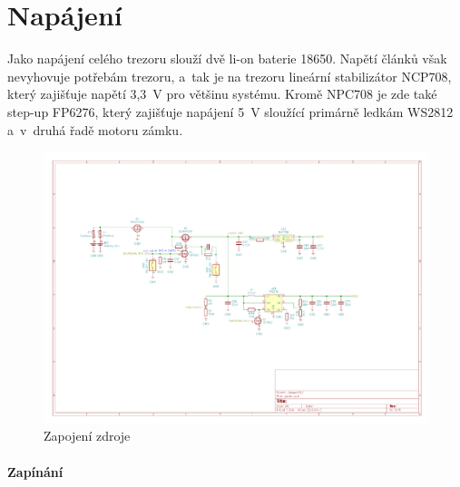 \section{Napájení}

Jako napájení celého trezoru slouží dvě li-on baterie 18650. Napětí článků však nevyhovuje potřebám trezoru, a~tak je na trezoru lineární 
stabilizátor NCP708, který zajišťuje napětí 3,3~V pro většinu systému. Kromě NPC708 je zde také step-up FP6276, který zajišťuje napájení 5~V 
sloužící primárně ledkám WS2812 a~v~druhá řadě motoru zámku. 

\begin{figure}[htbp]
    \centering
    \includegraphics[width=\textwidth]{kapitoly/obrazky/E4/napajeni/zdroj.pdf}
    \caption{Zapojení zdroje}
    \label{fig:zdroj}
\end{figure}  %

\newpage

\paragraph*{Zapínání}

